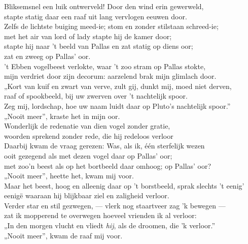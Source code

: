 \documentclass{memoir}
\begin{document}
\begin{multicols}{2}
\noindent Bliksemsnel een luik ontwerveld! Door den wind erin gewerweld,\\
stapte statig daar een raaf uit lang vervlogen eeuwen door.\\
Zelfs de lichtste buiging meed-ie; stom en zonder stilstaan schreed-ie;\\
met het air van lord of lady stapte hij de kamer door;\\
stapte hij naar 't beeld van Pallas en zat statig op diens oor;\\
\indent\indent zat en zweeg op Pallas' oor.\\

\noindent 't Ebben vogelbeest verlokte, waar 't zoo stram op Pallas stokte,\\
mijn verdriet door zijn decorum: aarzelend brak mijn glimlach door.\\
„Kort van kuif en zwart van verve, zult gij, dunkt mij, moed niet derven,\\
raaf of spookbeeld, bij uw zwerven over 't nachtelijk spoor.\\
Zeg mij, lordschap, hoe uw naam luidt daar op Pluto's nachtelijk spoor.”\\
\indent\indent „Nooit meer”, kraste het in mijn oor.\\

\noindent Wonderlijk de redenatie van dien vogel zonder gratie,\\
woorden sprekend zonder rede, die hij redeloos verloor\\
Daarbij kwam de vraag gerezen: Was, als ik, één sterfelijk wezen\\
ooit gezegend als met dezen vogel daar op Pallas' oor;\\
met zoo'n beest als op het bortbeeld daar omhoog; op Pallas' oor?\\
\indent\indent „Nooit meer”, heette het, kwam mij voor.\\

\noindent Maar het beest, hoog en alleenig daar op 't borstbeeld, sprak slechts 't eenig'\\
eenigë waaraan hij blijkbaar ziel en zaligheid verloor.\\
Verder star en stil gezwegen, — vlerk nog staartveer zag 'k bewegen —\\
zat ik mopperend te overwegen hoeveel vrienden ik al verloor:\\
„In den morgen vlucht en vliedt {\itshape hij}, als de droomen, die 'k verloor.”\\
\indent\indent „Nooit meer”, kwam de raaf mij voor.\\


\end{multicols}
\end{document}
